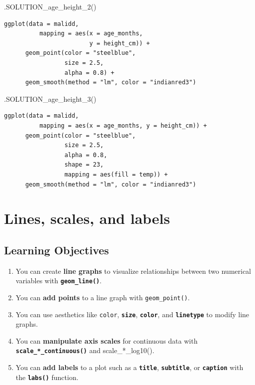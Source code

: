 \documentclass[
  letterpaper,
  DIV=11,
  numbers=noendperiod]{scrreprt}
\newenvironment{Shaded}{\begin{snugshade}}{\end{snugshade}}
\newcommand{\FunctionTok}[1]{\textcolor[rgb]{0.28,0.35,0.67}{#1}}
\newcommand{\NormalTok}[1]{\textcolor[rgb]{0.00,0.23,0.31}{#1}}
\providecommand{\tightlist}{%
  \setlength{\itemsep}{0pt}\setlength{\parskip}{0pt}}\usepackage{longtable,booktabs,array}
\begin{document}
\begin{Shaded}
\begin{Highlighting}[]
\FunctionTok{.SOLUTION\_age\_height\_2}\NormalTok{()}
\end{Highlighting}
\end{Shaded}

\begin{verbatim}
ggplot(data = malidd, 
          mapping = aes(x = age_months, 
                        y = height_cm)) + 
      geom_point(color = "steelblue",
                 size = 2.5,
                 alpha = 0.8) +
      geom_smooth(method = "lm", color = "indianred3")
\end{verbatim}

\begin{Shaded}
\begin{Highlighting}[]
\FunctionTok{.SOLUTION\_age\_height\_3}\NormalTok{()}
\end{Highlighting}
\end{Shaded}

\begin{verbatim}
ggplot(data = malidd, 
          mapping = aes(x = age_months, y = height_cm)) + 
      geom_point(color = "steelblue",
                 size = 2.5,
                 alpha = 0.8,
                 shape = 23,
                 mapping = aes(fill = temp)) +
      geom_smooth(method = "lm", color = "indianred3")
\end{verbatim}

\chapter{Lines, scales, and labels}\label{lines-scales-and-labels}

\section{Learning Objectives}\label{learning-objectives-16}

\begin{enumerate}
\def\labelenumi{\arabic{enumi}.}
\tightlist
\item
  You can create \textbf{line graphs} to visualize relationships between
  two numerical variables with \textbf{\texttt{geom\_line()}}.
\item
  You can \textbf{add points} to a line graph with
  \texttt{geom\_point()}.
\item
  You can use aesthetics like \texttt{color}, \textbf{\texttt{size}},
  \textbf{\texttt{color}}, and \textbf{\texttt{linetype}} to modify line
  graphs.
\item
  You can \textbf{manipulate axis scales} for continuous data with
  \textbf{\texttt{scale\_*\_continuous()}} and scale\_*\_log10().
\item
  You can \textbf{add labels} to a plot such as a
  \textbf{\texttt{title}}, \textbf{\texttt{subtitle}}, or
  \textbf{\texttt{caption}} with the \textbf{\texttt{labs()}} function.
\end{enumerate}
\end{document}
